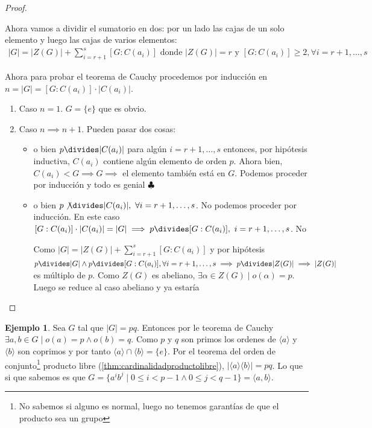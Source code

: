\documentclass{book}
\theoremstyle{definition}
\newtheorem{ej}{Ejemplo}
\theoremstyle{remark}
\renewcommand\qedsymbol{$\clubsuit$}
\begin{document}
\begin{proof}
\begin{itemize}
		Ahora vamos a dividir el sumatorio en dos: por un lado las cajas de un solo elemento y luego las cajas de varios elementos:
		\begin{align}
			\label{eq:thmcauchy}
			|G| = |Z(G)| + \sum_{i = r + 1}^{s} [G : C(a_i)] \text{ donde } |Z(G)| = r \text{ y } [G : C(a_i)] \geq 2, \forall i = r+1,\dots, s
		\end{align}
		
		Ahora para probar el teorema de Cauchy procedemos por inducción en $n = |G| = [G:C(a_i)]\cdot |C(a_i)|$.
		
		\begin{enumerate}
			\item Caso $n = 1$. $G = \{e\}$ que es obvio.
			\item Caso $n \implies n+1$. Pueden pasar dos cosas:
			\begin{itemize}
				\item o bien $p \divides |C(a_i)|$ para algún $i = r+1, \dots, s$ entonces, por hipótesis inductiva, $C(a_i)$ contiene algún elemento de orden $p$. Ahora bien, $C(a_i) < G \implies G \implies $ el elemento también está en $G$. Podemos proceder por inducción y todo es genial \qedsymbol
				
				\item o bien $p \not\divides |C(a_i)|,\ \forall i = r+1,\dots,s$. No podemos proceder por inducción. En este caso $[G:C(a_i)]\cdot |C(a_i)| = |G| \implies p \divides [G: C(a_i)],\ i = r+1,\dots, s$. No
				
				Como $|G| = |Z(G)| + \sum_{i = r + 1}^{s} [G : C(a_i)]$ y por hipótesis $p \divides |G| \land p \divides [G : C(a_i)], \forall i = r+1,\dots,s \implies p \divides |Z(G)| \implies |Z(G)|$ es múltiplo de $p$. Como $Z(G)$ es abeliano, $\exists \alpha \in Z(G) \mid o(\alpha) = p$. Luego se reduce al caso abeliano y ya estaría \qedhere
			\end{itemize}
		\end{enumerate}
	\end{itemize}
\end{proof}

\begin{ej}
	Sea $G$ tal que $|G| = pq$. Entonces por le teorema de Cauchy $\exists a,b \in G \mid o(a) = p \land o(b) = q$. Como $p$ y $q$ son primos los ordenes de $\langle a \rangle$ y $\langle b \rangle$ son coprimos y por tanto $\langle a \rangle \cap \langle b \rangle = \{e\}$. Por el teorema del orden de conjunto\footnote{No sabemos si alguno es normal, luego no tenemos garantías de que el producto sea un grupo} producto libre (\ref{thm:cardinalidadproductolibre}), $|\langle a \rangle \langle b \rangle| = pq$. Lo que si que sabemos es que $G = \{a^ib^j \mid 0 \leq i < p -1 \land 0 \leq j < q - 1\} = \langle a, b \rangle$.
\end{ej}
\end{document}
